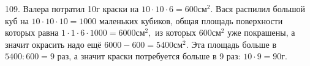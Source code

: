 109. Валера потратил 10г краски на $10\cdot10\cdot6=600\text{см}^2.$ Вася распилил большой куб на $10\cdot10\cdot10=1000$ маленьких кубиков, общая площадь поверхности которых равна $1\cdot1\cdot6\cdot1000=6000\text{см}^2,$ из которых $600\text{см}^2$ уже покрашены, а значит окрасить надо ещё $6000-600=5400\text{см}^2.$ Эта площадь больше в $5400:600=9$ раз, а значит краски потребуется больше в 9 раз: $10\cdot9=90$г.\\
